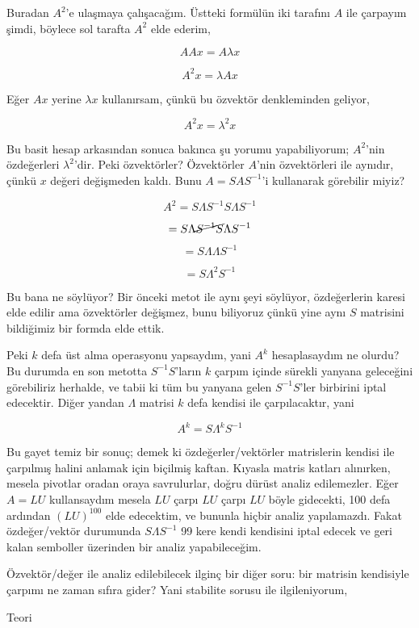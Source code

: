 \documentclass[12pt,fleqn]{article}\usepackage{../../common}
\begin{document}
Buradan $A^2$'e ulaşmaya çalışacağım. Üstteki formülün iki tarafını $A$ ile
çarpayım şimdi, böylece sol tarafta $A^2$ elde ederim,

$$ AAx = A\lambda x $$

$$ A^2x = \lambda A x $$

Eğer $Ax$ yerine $\lambda x$ kullanırsam, çünkü bu özvektör denkleminden geliyor,

$$ A^2x = \lambda^2 x $$

Bu basit hesap arkasından sonuca bakınca şu yorumu yapabiliyorum; $A^2$'nin
özdeğerleri $\lambda^2$'dir. Peki özvektörler? Özvektörler $A$'nin
özvektörleri ile aynıdır, çünkü $x$ değeri değişmeden kaldı. Bunu
$A=SAS^{-1}$'i kullanarak görebilir miyiz?

$$
A^2=S\Lambda S^{-1}S\Lambda S^{-1}
$$

$$
=S \Lambda \cancel{S^{-1}S} \Lambda S^{-1}
$$

$$
=S \Lambda \Lambda S^{-1}
$$

$$
=S \Lambda^2S^{-1}
$$

Bu bana ne söylüyor? Bir önceki metot ile aynı şeyi söylüyor, özdeğerlerin
karesi elde edilir ama özvektörler değişmez, bunu biliyoruz çünkü yine aynı $S$
matrisini bildiğimiz bir formda elde ettik.

Peki $k$ defa üst alma operasyonu yapsaydım, yani $A^k$ hesaplasaydım ne
olurdu? Bu durumda en son metotta $S^{-1}S$'ların $k$ çarpım içinde sürekli
yanyana geleceğini görebiliriz herhalde, ve tabii ki tüm bu yanyana gelen
$S^{-1}S$'ler birbirini iptal edecektir. Diğer yandan $\Lambda$ matrisi
$k$ defa kendisi ile çarpılacaktır, yani

$$
A^k = S\Lambda^k S^{-1}
$$

Bu gayet temiz bir sonuç; demek ki özdeğerler/vektörler matrislerin kendisi
ile çarpılmış halini anlamak için biçilmiş kaftan. Kıyasla matris katları
alınırken, mesela pivotlar oradan oraya savrulurlar, doğru dürüst analiz
edilemezler. Eğer $A=LU$ kullansaydım mesela $LU$ çarpı $LU$ çarpı $LU$
böyle gidecekti, 100 defa ardından $(LU)^{100}$ elde edecektim, ve bununla
hiçbir analiz yapılamazdı. Fakat özdeğer/vektör durumunda $S\Lambda S^{-1}$
99 kere kendi kendisini iptal edecek ve geri kalan semboller üzerinden bir
analiz yapabileceğim.

Özvektör/değer ile analiz edilebilecek ilginç bir diğer soru: bir matrisin
kendisiyle çarpımı ne zaman sıfıra gider? Yani stabilite sorusu ile
ilgileniyorum, 

Teori
\end{document}
